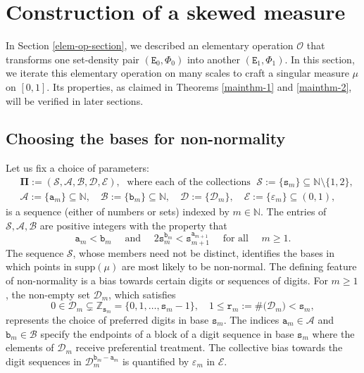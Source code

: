 \documentclass[12pt, twoside]{article}
\theoremstyle{definition}
\numberwithin{equation}{section}
\begin{document}
\section{Construction of a skewed measure} \label{iteration-section}
In Section \ref{elem-op-section}, we described an elementary operation $\mathscr{O}$ that transforms one set-density pair $(\mathtt E_0, \Phi_0)$ into another $(\mathtt E_1, \Phi_1)$.  In this section, we iterate this elementary operation on many scales to craft a singular measure $\mu$ on $[0,1]$. Its properties, as claimed in Theorems \ref{mainthm-1} and \ref{mainthm-2}, will be verified in later sections. 
\subsection{Choosing the bases for non-normality} \label{iteration-parameters-section} 
Let us fix a choice of parameters:
\begin{align}  \label{param-seq}
&\pmb{\Pi} := (\mathcal S, \mathcal A, \mathcal B, \mathcal D, \mathcal E), \; \text{ where each of the collections } \; \mathcal S := \bigl\{\mathtt s_m \bigr\} \subseteq \mathbb N \setminus \{1, 2\}, \\ & \mathcal A := \bigl\{\mathtt a_m \bigl\} \subseteq \mathbb N, \quad \mathcal B := \bigl\{\mathtt b_m \bigr\} \subseteq \mathbb N, \quad \mathcal D := \bigl\{\mathscr{D}_m \bigr\}, \quad  \mathcal E := \bigl\{\varepsilon_m\bigr\} \subseteq (0, 1), \nonumber
\end{align} 
is a sequence (either of numbers or sets) indexed by $m \in \mathbb N$. The entries of $\mathcal S, \mathcal A, \mathcal B$ are positive integers with the property that 
\begin{equation} \label{abs}
\mathtt a_m < \mathtt b_m \quad \text{ and } \quad 2 \mathtt s_{m}^{\mathtt b_m} < \mathtt s_{m+1}^{\mathtt a_{m+1}} \quad \text{ for all } \quad m \geq 1. 
\end{equation} 
The sequence $\mathcal S$, whose members need not be distinct, identifies the bases in which points in supp$(\mu)$ are most likely to be non-normal. The defining feature of non-normality is a bias towards certain digits or sequences of digits. For $m \geq 1$, the non-empty set $\mathscr{D}_m$, which satisfies
\begin{equation} \label{rmsm-assumption}
 0 \in \mathscr{D}_m \subsetneq \mathbb Z_{\mathtt s_m} = \bigl\{0, 1, \ldots, \mathtt s_m-1 \bigr\}, \quad 1 \leq \mathtt r_m := \# \bigl(\mathscr{D}_m \bigr) < \mathtt s_{m}, 
\end{equation}
represents the choice of preferred digits in base $\mathtt s_m$. The indices $\mathtt a_m \in \mathcal A$ and $\mathtt b_m \in \mathcal B$ specify the endpoints of a block of a digit sequence in base $\mathtt s_m$ where the elements of $\mathscr{D}_m$ receive preferential treatment. The collective bias towards the digit sequences in $\mathscr{D}_m^{\mathtt b_m-\mathtt a_m}$ is quantified by $\varepsilon_m$ in $\mathcal E$.  
\end{document}
